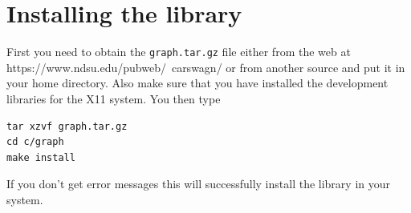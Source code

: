 \documentclass[12pt,letterpaper]{article}
\begin{document}
\appendix

\section{Installing the library}
\label{install}
First you need to obtain the \texttt{graph.tar.gz} file either from
the web at https://www.ndsu.edu/pubweb/~carswagn/
or from another source and put it in your home directory.
Also make sure that you have installed the development libraries for the X11 system.
You then type
\begin{verbatim}
tar xzvf graph.tar.gz
cd c/graph
make install
\end{verbatim}
If you don't get error messages this will successfully install the
library in your system.
\end{document}
